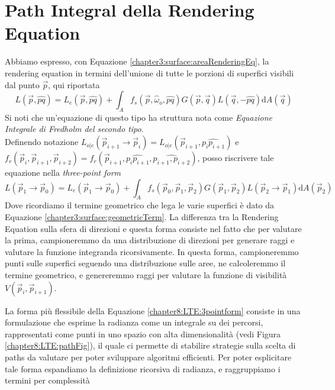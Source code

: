 \section{Path Integral della Rendering Equation}
Abbiamo espresso, con Equazione \ref{chapter3:surface:areaRenderingEq}, la rendering equation in termini dell'unione di tutte le porzioni di 
superfici visibili dal punto $\vec{p}$, qui riportata
\begin{equation*}
	L(\vec{p},\hat{pq}) %
		= L_e(\vec{p},\hat{pq}) + \int_{A}f_s(\vec{p},\hat{\omega}_o,\hat{pq})G(\vec{p},\vec{q})L(\vec{q},-\hat{pq})\mathrm{d}A(\vec{q})
\end{equation*}
Si noti che un'equazione di questo tipo ha struttura nota come \textit{Equazione Integrale di Fredholm del secondo tipo}.\\
Definendo notazione \mbox{$L_{o|e}(\vec{p}_{i+1}\to\vec{p}_i)=L_{o|e}(\vec{p}_{i+1},\hat{p_ip_{i+1}})$} e \\
\mbox{$f_r(\vec{p}_i,\vec{p}_{i+1},\vec{p}_{i+2})=f_r(\vec{p}_{i+1},\hat{p_ip_{i+1}},\hat{p_{i+1},p_{i+2}})$}, posso riscrivere tale equazione nella 
\textit{three-point form}
\begin{equation}\label{chapter8:LTE:3pointform}
	L(\vec{p}_1\to\vec{p}_0) %
		= L_e(\vec{p}_1\to\vec{p}_0)+\int_{A}f_s(\vec{p}_0,\vec{p}_1,\vec{p}_2)G(\vec{p}_1,\vec{p}_2)L(\vec{p}_2\to\vec{p}_1)\mathrm{d}A(\vec{p}_2)
\end{equation}
Dove ricordiamo il termine geometrico che lega le varie superfici \`e dato da Equazione \ref{chapter3:surface:geometricTerm}. La differenza tra 
la Rendering Equation sulla sfera di direzioni e questa forma consiste nel fatto che per valutare la prima, campioneremmo da una distribuzione di 
direzioni per generare raggi e valutare la funzione integranda ricorsivamente. In questa forma, campioneremmo punti sulle superfici seguendo una 
distribuzione sulle aree, ne calcoleremmo il termine geometrico, e genereremmo raggi per valutare la funzione di visibilit\`a 
\mbox{$V(\vec{p}_i,\vec{p}_{i+1})$}.\par 
La forma pi\`u flessibile della Equazione \ref{chapter8:LTE:3pointform} consiste in una formulazione che esprime la radianza come un integrale su 
dei percorsi, rappresentati come punti in uno spazio con alta dimensionalit\`a (vedi Figura \ref{chapter8:LTE:pathFig}), il quale ci permette di 
stabilire strategie sulla scelta di paths da valutare per poter sviluppare algoritmi efficienti. Per poter esplicitare tale forma espandiamo la 
definizione ricorsiva di radianza, e raggruppiamo i termini per complessit\`a

